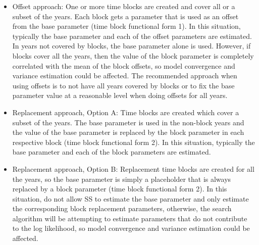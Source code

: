 \begin{itemize}
	\item Offset approach: One or more time blocks are created and cover all or a subset of the years. Each block gets a parameter that is used as an offset from the base parameter (time block functional form 1). In this situation, typically the base parameter and each of the offset parameters are estimated. In years not covered by blocks, the base parameter alone is used.  However, if blocks cover all the years, then the value of the block parameter is completely correlated with the mean of the block offsets, so model convergence and variance estimation could be affected.  The recommended approach when using offsets is to not have all years covered by blocks or to fix the base parameter value at a reasonable level when doing offsets for all years.	
	
	\item Replacement approach, Option A: Time blocks are created which cover a subset of the years. The base parameter is used in the non-block years and the value of the base parameter is replaced by the block parameter in each respective block (time block functional form 2). In this situation, typically the base parameter and each of the block parameters are estimated.	
	
	\item Replacement approach, Option B: Replacement time blocks are created for all the years, so the base parameter is simply a placeholder that is always replaced by a block parameter (time block functional form 2). In this situation, do not allow SS to estimate the base parameter and only estimate the corresponding block replacement parameters, otherwise, the search algorithm will be attempting to estimate parameters that do not contribute to the log likelihood, so model convergence and variance estimation could be affected.
\end{itemize}



